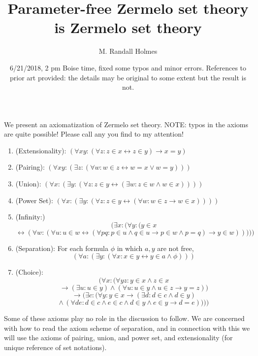\documentclass[12pt]{article}
\title{Parameter-free Zermelo set theory is Zermelo set theory}
\author{M. Randall Holmes}
\date{6/21/2018, 2 pm Boise time, fixed some typos and minor errors.  References to prior art provided:  the details may be original to some extent but the result is not.}
\begin{document}
\maketitle

We present an axiomatization of Zermelo set theory.  NOTE:  typos in the axioms are quite possible!  Please call any you find to my attention!

\begin{enumerate}

\item (Extensionality):  $(\forall xy:(\forall z:z\in x \leftrightarrow z \in y) \rightarrow x=y)$

\item (Pairing):  $(\forall xy:(\exists z:(\forall w: w \in z \leftrightarrow w=x\vee w=y)))$

\item (Union):  $(\forall x:(\exists y:(\forall z:z\in y \leftrightarrow (\exists w:z \in w \wedge w \in x))))$

\item (Power Set):  $(\forall x:(\exists y:(\forall z:z \in y \leftrightarrow (\forall w:w \in z \rightarrow w \in x))))$

\item (Infinity:) $$(\exists x:(\forall y:(y \in x $$ $$\leftrightarrow (\forall w:(\forall u:u \in w \leftrightarrow (\forall pq:p \in u \wedge q \in u \rightarrow p\in w \wedge p=q) \rightarrow y \in w)))))$$

\item (Separation):  For each formula $\phi$ in which $a,y$ are not free, $$(\forall a:(\exists y:(\forall x:x \in y \leftrightarrow y \in a \wedge \phi)))$$

\item (Choice):  $$(\forall x:(\forall yz:y \in x \wedge z \in x $$ $$\rightarrow (\exists u:u \in y) \wedge (\forall u:u \in y \wedge u \in z \rightarrow y=z)) $$ $$\rightarrow (\exists c:(\forall y:y \in x \rightarrow (\exists d:d \in c \wedge d \in y) $$ $$\wedge\, (\forall de: d \in c \wedge e \in c \wedge d \in y \wedge e \in y\rightarrow d=e))))$$


\end{enumerate}

Some of these axioms play no role in the discussion to follow.  We are concerned with how to read the axiom scheme of separation, and in connection with this we will use the axioms of pairing, union, and power set, and extensionality (for unique reference of set notations).
\end{document}

